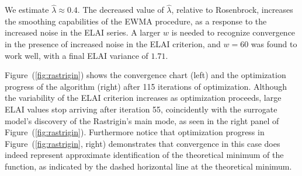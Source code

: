\documentclass{article}
\begin{document}
We estimate $\hat\lambda \approx 0.4$. The 
decreased value of $\hat\lambda$, relative to Rosenbrock, increases the 
smoothing capabilities of the EWMA procedure, as a response to the increased 
noise in the ELAI series. %
A larger $w$ is needed to recognize convergence in the presence of increased 
noise in the ELAI criterion, and $w=60$ was found to work well, with a 
final ELAI variance of $1.71$.

%
%

%
Figure~(\ref{fig:rastrigin}) shows the convergence chart (left) and the 
optimization progress of the algorithm (right) after 115 iterations of 
optimization. Although the variability of the ELAI criterion increases as 
optimization proceeds, large ELAI values stop arriving after iteration 55, 
coincidently with the surrogate model's discovery of the Rastrigin's main 
mode, as seen in the right panel of Figure~(\ref{fig:rastrigin}). Furthermore 
notice that optimization progress in Figure~(\ref{fig:rastrigin}, right) 
demonstrates that convergence in this case does indeed represent approximate 
identification of the theoretical minimum of the function, as indicated by the 
dashed horizontal line at the theoretical minimum. 

%
%
%

\end{document}
